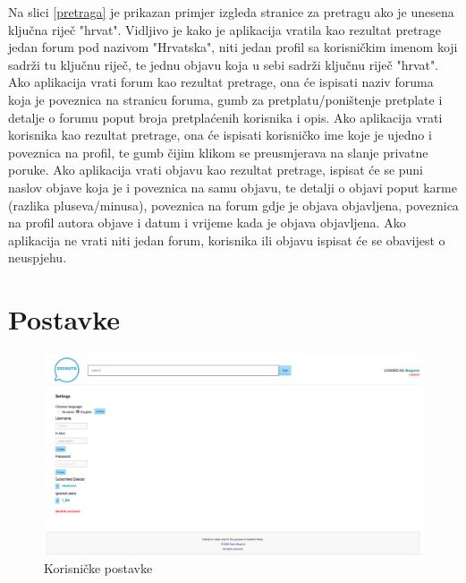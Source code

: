 \documentclass{foi}
\begin{document}
Na slici \ref{pretraga} je prikazan primjer izgleda stranice za pretragu ako je unesena ključna riječ "hrvat". Vidljivo je kako je aplikacija vratila kao rezultat pretrage jedan forum pod nazivom "Hrvatska", niti jedan profil sa korisničkim imenom koji sadrži tu ključnu riječ, te jednu objavu koja u sebi sadrži ključnu riječ "hrvat". Ako aplikacija vrati forum kao rezultat pretrage, ona će ispisati naziv foruma koja je poveznica na stranicu foruma, gumb za pretplatu/poništenje pretplate i detalje o forumu poput broja pretplaćenih korisnika i opis. Ako aplikacija vrati korisnika kao rezultat pretrage, ona će ispisati korisničko ime koje je ujedno i poveznica na profil, te gumb čijim klikom se preusmjerava na slanje privatne poruke. Ako aplikacija vrati objavu kao rezultat pretrage, ispisat će se puni naslov objave koja je i poveznica na samu objavu, te detalji o objavi poput karme (razlika pluseva/minusa), poveznica na forum gdje je objava objavljena, poveznica na profil autora objave i datum i vrijeme kada je objava objavljena. Ako aplikacija ne vrati niti jedan forum, korisnika ili objavu ispisat će se obavijest o neuspjehu.

\section{Postavke}

\begin{figure}[h!]
    \centering
    \includegraphics[width=1\textwidth]{slike/postavke.png}
    \caption{Korisničke postavke}
\end{figure}
\end{document}
